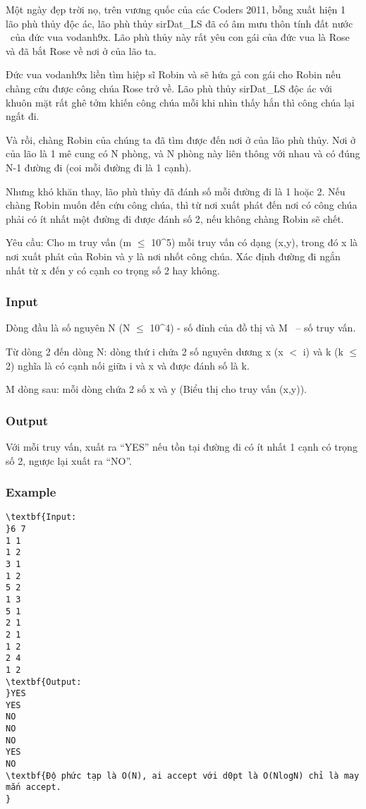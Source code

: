 

Một ngày đẹp trời nọ, trên vương quốc của các Coders 2011, bỗng xuất hiện 1 lão phù thủy độc ác, lão phù thủy sirDat\_LS đã có âm mưu thôn tính đất nước  của đức vua vodanh9x. Lão phù thủy này rất yêu con gái của đức vua là Rose và đã bắt Rose về nơi ở của lão ta.

Đức vua vodanh9x liền tìm hiệp sĩ Robin và sẽ hứa gả con gái cho Robin nếu chàng cứu được công chúa Rose trở về. Lão phù thủy sirDat\_LS độc ác với khuôn mặt rất ghê tởm khiến công chúa mỗi khi nhìn thấy hắn thì công chúa lại ngất đi.

Và rồi, chàng Robin của chúng ta đã tìm được đến nơi ở của lão phù thủy. Nơi ở của lão là 1 mê cung có N phòng, và N phòng này liên thông với nhau và có đúng N-1 đường đi (coi mỗi đường đi là 1 cạnh).

Nhưng khó khăn thay, lão phù thủy đã đánh số mỗi đường đi là 1 hoặc 2. Nếu chàng Robin muốn đến cứu công chúa, thì từ nơi xuất phát đến nơi có công chúa phải có ít nhất một đường đi được đánh số 2, nếu không chàng Robin sẽ chết.

Yêu cầu: Cho m truy vấn (m  $\le$  10\textasciicircum5) mỗi truy vấn có dạng (x,y), trong đó x là nơi xuất phát của Robin và y là nơi nhốt công chúa. Xác định đường đi ngắn nhất từ x đến y có cạnh co trọng số 2 hay không.

\subsubsection{Input}

Dòng đầu là số nguyên N (N  $\le$  10\textasciicircum4) - số đỉnh của đồ thị và M  – số truy vấn.

Từ dòng 2 đến dòng N: dòng thứ i chứa 2 số nguyên dương x (x $<$ i) và k (k  $\le$  2) nghĩa là có cạnh nối giữa i và x và được đánh số là k.

M dòng sau: mỗi dòng chứa 2 số x và y (Biểu thị cho truy vấn (x,y)).

\subsubsection{Output}

Với mỗi truy vấn, xuất ra “YES” nếu tồn tại đường đi có ít nhất 1 cạnh có trọng số 2, ngược lại xuất ra “NO”.

\subsubsection{Example}
\begin{verbatim}
\textbf{Input:
}6 7
1 1
1 2
3 1
1 2
5 2
1 3
5 1
2 1
2 1
1 2
2 4
1 2
\textbf{Output: 
}YES
YES
NO
NO
NO
YES
NO
\textbf{Độ phức tạp là O(N), ai accept với d0pt là O(NlogN) chỉ là may mắn accept.
}\end{verbatim}
